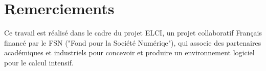 \documentclass[parallelisme]{compas2017}
\begin{document}
\section*{Remerciements}
Ce travail est réalisé dans le cadre du projet ELCI, un projet collaboratif Français financé par le FSN ("Fond pour la Société Numériqe"), qui associe des partenaires académiques et industriels pour concevoir et produire un
environnement logiciel pour le calcul intensif.


\end{document}
